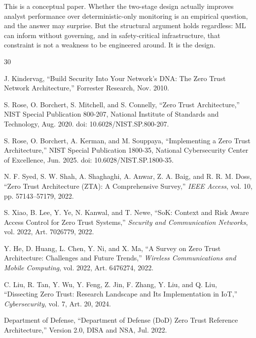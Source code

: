 \documentclass[conference]{IEEEtran}
\begin{document}
This is a conceptual paper. Whether the two-stage design actually improves analyst performance over deterministic-only monitoring is an empirical question, and the answer may surprise. But the structural argument holds regardless: ML can inform without governing, and in safety-critical infrastructure, that constraint is not a weakness to be engineered around. It is the design.


\begin{thebibliography}{30}

J. Kindervag, ``Build Security Into Your Network's DNA: The Zero Trust Network Architecture,'' Forrester Research, Nov. 2010.

S. Rose, O. Borchert, S. Mitchell, and S. Connelly, ``Zero Trust Architecture,'' NIST Special Publication 800-207, National Institute of Standards and Technology, Aug. 2020. doi: 10.6028/NIST.SP.800-207.

S. Rose, O. Borchert, A. Kerman, and M. Souppaya, ``Implementing a Zero Trust Architecture,'' NIST Special Publication 1800-35, National Cybersecurity Center of Excellence, Jun. 2025. doi: 10.6028/NIST.SP.1800-35.

N. F. Syed, S. W. Shah, A. Shaghaghi, A. Anwar, Z. A. Baig, and R. R. M. Doss, ``Zero Trust Architecture (ZTA): A Comprehensive Survey,'' \textit{IEEE Access}, vol. 10, pp. 57143--57179, 2022.

S. Xiao, B. Lee, Y. Ye, N. Kanwal, and T. Newe, ``SoK: Context and Risk Aware Access Control for Zero Trust Systems,'' \textit{Security and Communication Networks}, vol. 2022, Art. 7026779, 2022.

Y. He, D. Huang, L. Chen, Y. Ni, and X. Ma, ``A Survey on Zero Trust Architecture: Challenges and Future Trends,'' \textit{Wireless Communications and Mobile Computing}, vol. 2022, Art. 6476274, 2022.

C. Liu, R. Tan, Y. Wu, Y. Feng, Z. Jin, F. Zhang, Y. Liu, and Q. Liu, ``Dissecting Zero Trust: Research Landscape and Its Implementation in IoT,'' \textit{Cybersecurity}, vol. 7, Art. 20, 2024.

Department of Defense, ``Department of Defense (DoD) Zero Trust Reference Architecture,'' Version 2.0, DISA and NSA, Jul. 2022.


\end{thebibliography}
\end{document}
